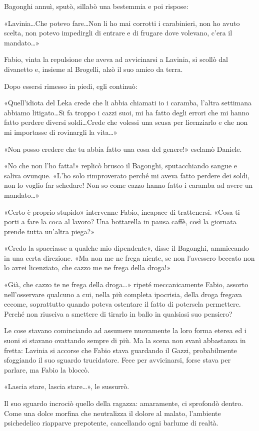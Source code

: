 Bagonghi annuì, sputò, sillabò una bestemmia e poi rispose:

«Lavinia\ldots Che potevo fare\ldots Non li ho mai corrotti i carabinieri, non ho avuto scelta, non potevo impedirgli di entrare e di frugare dove volevano, c'era il mandato\ldots»

Fabio, vinta la repulsione che aveva ad avvicinarsi a Lavinia, si scollò dal divanetto e, insieme al Brogelli, alzò il suo amico da terra.

Dopo essersi rimesso in piedi, egli continuò:

«Quell'idiota del Leka crede che li abbia chiamati io i caramba, l'altra settimana abbiamo litigato\ldots Si fa troppo i cazzi suoi, mi ha fatto degli errori che mi hanno fatto perdere diversi soldi\ldots Crede che volessi una scusa per licenziarlo e che non mi importasse di rovinargli la vita\ldots»

«Non posso credere che tu abbia fatto una cosa del genere!» esclamò Daniele.

«No che non l'ho fatta!» replicò brusco il Bagonghi, sputacchiando sangue e saliva ovunque. «L'ho solo rimproverato perché mi aveva fatto perdere dei soldi, non lo voglio far schedare! Non so come cazzo hanno fatto i caramba ad avere un mandato\ldots»

«Certo è proprio stupido» intervenne Fabio, incapace di trattenersi. «Cosa ti porti a fare la coca al lavoro? Una bottarella in pausa caffè, così la giornata prende tutta un'altra piega?»

«Credo la spacciasse a qualche mio dipendente», disse il Bagonghi, ammiccando in una certa direzione. «Ma non me ne frega niente, se non l'avessero beccato non lo avrei licenziato, che cazzo me ne frega della droga!»

«Già, che cazzo te ne frega della droga\ldots» ripeté meccanicamente Fabio, assorto nell'osservare qualcuno a cui, nella più completa ipocrisia, della droga fregava eccome, soprattutto quando poteva ostentare il fatto di potersela permettere. Perché non riusciva a smettere di tirarlo in ballo in qualsiasi suo pensiero?

Le cose stavano cominciando ad assumere nuovamente la loro forma eterea ed i suoni si stavano ovattando sempre di più. Ma la scena non svanì abbastanza in fretta: Lavinia si accorse che Fabio stava guardando il Gazzi, probabilmente sfoggiando il suo sguardo trucidatore. Fece per avvicinarsi, forse stava per parlare, ma Fabio la bloccò.

«Lascia stare, lascia stare\ldots», le sussurrò.

Il suo sguardo incrociò quello della ragazza: amaramente, ci sprofondò dentro. Come una dolce morfina che neutralizza il dolore al malato, l'ambiente psichedelico riapparve prepotente, cancellando ogni barlume di realtà.

